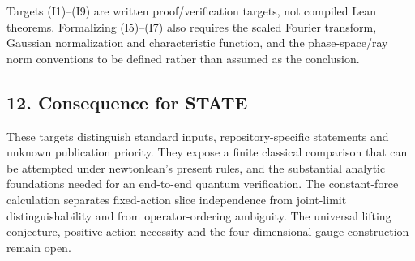 \documentclass[11pt,a4paper]{article}
\begin{document}
Targets (I1)--(I9) are written proof/verification targets, not compiled
Lean theorems. Formalizing (I5)--(I7) also requires the scaled Fourier
transform, Gaussian normalization and characteristic function, and the
phase-space/ray norm conventions to be defined rather than assumed as
the conclusion.

\hypertarget{consequence-for-state}{%
\subsection{12. Consequence for STATE}\label{consequence-for-state}}

These targets distinguish standard inputs, repository-specific
statements and unknown publication priority. They expose a finite
classical comparison that can be attempted under newtonlean's present
rules, and the substantial analytic foundations needed for an end-to-end
quantum verification. The constant-force calculation separates
fixed-action slice independence from joint-limit distinguishability and
from operator-ordering ambiguity. The universal lifting conjecture,
positive-action necessity and the four-dimensional gauge construction
remain open.
\end{document}
